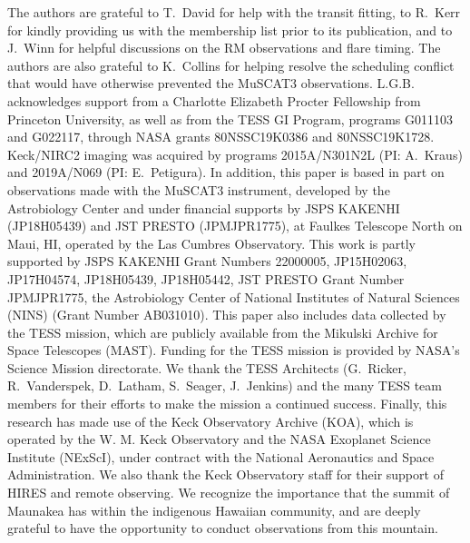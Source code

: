 \documentclass[12pt,modern,twocolumn,tighten]{aastex63}
\begin{document}


\acknowledgements
\raggedbottom

The authors are grateful to T{.}~David for help with the transit
fitting, to R{.}~Kerr for kindly providing us with the
\citet{Kerr2021} membership list prior to its publication, and to
J{.}~Winn for helpful discussions on the RM observations and flare
timing.
The authors are also grateful to K{.}~Collins for
helping resolve the scheduling conflict that would have otherwise
prevented the MuSCAT3 observations.
%
L.G.B{.} acknowledges support from a Charlotte Elizabeth Procter
Fellowship from Princeton University, as well as from the TESS GI Program, programs
G011103 and G022117, through NASA grants 80NSSC19K0386 and
80NSSC19K1728.
%
%
Keck/NIRC2 imaging was acquired by programs 2015A/N301N2L
(PI: A.~Kraus) and 2019A/N069 (PI: E.~Petigura).
%
In addition, this paper is based in part on observations made with the
MuSCAT3 instrument, developed by the Astrobiology Center and under
financial supports by JSPS KAKENHI (JP18H05439) and JST PRESTO
(JPMJPR1775), at Faulkes Telescope North on Maui, HI, operated by the
Las Cumbres Observatory.
%
This work is partly supported by JSPS KAKENHI Grant Numbers 22000005,
JP15H02063, JP17H04574, JP18H05439, JP18H05442, JST PRESTO Grant
Number JPMJPR1775, the Astrobiology Center of National Institutes of
Natural Sciences (NINS) (Grant Number AB031010).
%
%
This paper also includes data collected by the TESS mission, which are
publicly available from the Mikulski Archive for Space Telescopes
(MAST).
%
Funding for the TESS mission is provided by NASA's Science Mission
directorate.
%
We thank the TESS Architects (G.~Ricker, R.~Vanderspek, D.~Latham,
S.~Seager, J.~Jenkins) and the many TESS team members for their
efforts to make the mission a continued success.
%
%
%
%
Finally, this research has made use of the Keck Observatory Archive (KOA),
which is operated by the W. M. Keck Observatory and the NASA Exoplanet
Science Institute (NExScI), under contract with the National
Aeronautics and Space Administration.  We also thank the Keck
Observatory staff for their support of HIRES and remote observing.  We
recognize the importance that the summit of Maunakea has within the
indigenous Hawaiian community, and are deeply grateful to have the
opportunity to conduct observations from this mountain.
%
%
\end{document}
